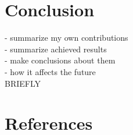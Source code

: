 \documentclass[12pt]{article}
\begin{document}
\newpage
\section{Conclusion}

\color{red}
- summarize my own contributions \\
- summarize achieved results \\
- make conclusions about them \\
- how it affects the future \\
BRIEFLY
\color{black}


\newpage
\section{References}
\end{document}
